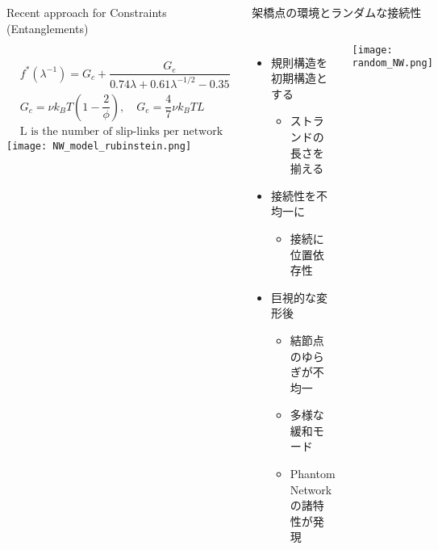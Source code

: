 \begin{columns}[totalwidth=.85\linewidth]
\begin{itembox}[l]{Recent approach for Constraints (Entanglements)}
		\begin{columns}[totalwidth=1\textwidth]
			\small
			\begin{align*}
				&f^*(\lambda^{-1}) = G_c + \dfrac{G_e}{0.74 \lambda + 0.61 \lambda^{-1/2} - 0.35} \\
				&G_c = \nu k_B T \left(1-\dfrac{2}{\phi} \right), \quad G_e = \dfrac{4}{7} \nu k_B T L \\
				& \text{L is the number of slip-links per network chain}
			\end{align*}
			\texttt{[image: NW\_model\_rubinstein.png]}
		\end{columns}
	\end{itembox}

	\begin{itembox}[l]{架橋点の環境とランダムな接続性\cite{flory}}
		\begin{columns}[totalwidth=\textwidth]

				\begin{itemize}
					\item 規則構造を初期構造とする
					\begin{itemize}
						\normalsize
						\item ストランドの長さを揃える
					\end{itemize}
					\item 接続性を不均一に
						\begin{itemize}
							\normalsize
							\item 接続に\alert{位置依存性}
						\end{itemize}
					\item 巨視的な変形後
						\begin{itemize}
							\normalsize
							\item \alert{結節点のゆらぎが不均一}
							\item 多様な緩和モード
						\item \alert{Phantom Network の諸特性が発現}
						\end{itemize}
				\end{itemize}
				\centering
				\texttt{[image: random\_NW.png]}
		\end{columns}
	\end{itembox}
\end{columns}